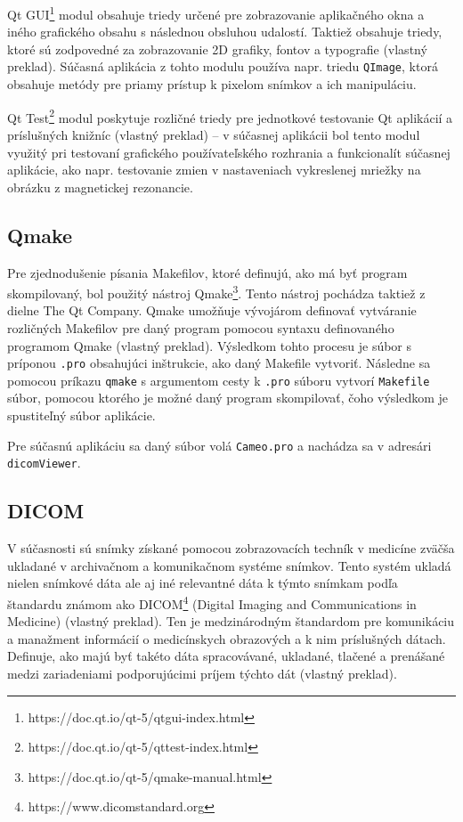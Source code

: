 Qt GUI\footnote{https://doc.qt.io/qt-5/qtgui-index.html} modul obsahuje triedy určené pre zobrazovanie aplikačného okna a iného grafického obsahu s následnou obsluhou udalostí. Taktiež obsahuje triedy, ktoré sú zodpovedné za zobrazovanie 2D grafiky, fontov a typografie \cite{qtgui_description} (vlastný preklad).
Súčasná aplikácia z tohto modulu používa napr. triedu \texttt{QImage}, ktorá obsahuje metódy pre priamy prístup k pixelom snímkov a ich manipuláciu. \newline

Qt Test\footnote{https://doc.qt.io/qt-5/qttest-index.html} modul poskytuje rozličné triedy pre jednotkové testovanie Qt aplikácií a príslušných knižníc \cite{qttest_description} (vlastný preklad) -- v súčasnej aplikácii bol tento modul využitý pri testovaní grafického používateľského rozhrania a funkcionalít súčasnej aplikácie, ako napr. testovanie zmien v nastaveniach vykreslenej mriežky na obrázku z magnetickej rezonancie.

\subsection {Qmake}\label{qmake}
Pre zjednodušenie písania Makefilov, ktoré definujú, ako má byť program skompilovaný, bol použitý nástroj Qmake\footnote{https://doc.qt.io/qt-5/qmake-manual.html}. Tento nástroj pochádza taktiež z dielne The Qt Company. Qmake umožňuje vývojárom definovať vytváranie rozličných Makefilov pre daný program pomocou syntaxu definovaného programom Qmake \cite{qmake_description} (vlastný preklad). Výsledkom tohto procesu je súbor s príponou \texttt{.pro} obsahujúci inštrukcie, ako daný Makefile vytvoriť. Následne sa pomocou príkazu \texttt{qmake} s argumentom cesty k \texttt{.pro} súboru vytvorí \texttt{Makefile} súbor, pomocou ktorého je možné daný program skompilovať, čoho výsledkom je spustiteľný súbor aplikácie.

Pre súčasnú aplikáciu sa daný súbor volá \texttt{Cameo.pro} a nachádza sa v adresári \texttt{dicomViewer}.

\subsection {DICOM}\label{dicom}
V súčasnosti sú snímky získané pomocou zobrazovacích techník v medicíne zväčša ukladané v archivačnom a komunikačnom systéme snímkov. Tento systém ukladá nielen snímkové dáta ale aj iné relevantné dáta k týmto snímkam podľa štandardu známom ako DICOM\footnote{https://www.dicomstandard.org} (Digital Imaging and Communications in Medicine) \cite{Varma_2012} (vlastný preklad). Ten je medzinárodným štandardom pre komunikáciu a manažment informácií o medicínskych obrazových a k nim príslušných dátach. Definuje, ako majú byť takéto dáta spracovávané, ukladané, tlačené a prenášané medzi zariadeniami podporujúcimi príjem týchto dát \cite{about_dicomlibrary} (vlastný preklad).


